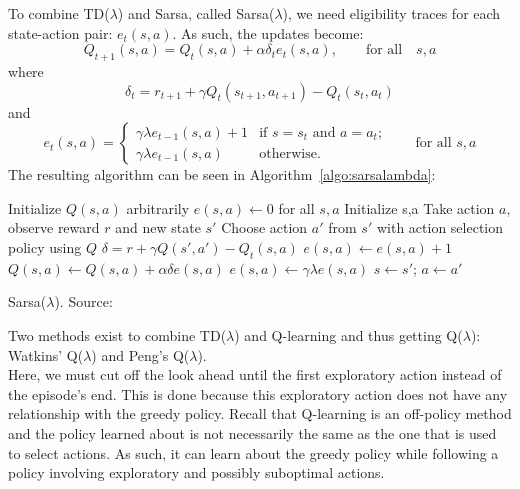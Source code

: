 To combine TD($\lambda$) and Sarsa, called Sarsa($\lambda$), we need eligibility traces for each state-action pair: $e_t(s,a)$. As such, the updates become:
\begin{equation}
Q_{t+1}(s,a) = Q_t(s,a) + \alpha \delta_t e_t(s,a), \qquad \text{for all} \quad s,a
\end{equation}
where
\begin{equation}
\delta_t = r_{t+1} + \gamma Q_t(s_{t+1},a_{t+1}) - Q_t(s_t,a_t)
\end{equation}
and
\begin{equation}
e_t(s,a) = \begin{cases}
    \gamma \lambda e_{t-1}(s,a) + 1 & \text{if $s=s_t$ and $a=a_t$;} \\
    \gamma \lambda e_{t-1}(s,a) & \text{otherwise}.
\end{cases}
\qquad \text{for all $s,a$}
\end{equation}
The resulting algorithm can be seen in Algorithm~\ref{algo:sarsalambda}:\\
\begin{algorithm}[htb]
\DontPrintSemicolon
Initialize $Q(s,a)$ arbitrarily\;
$e(s,a) \gets 0$ for all $s,a$\;
 {
    Initialize s,a\;
     {
        Take action $a$, observe reward $r$ and new state $s'$\;
        Choose action $a'$ from $s'$ with action selection policy using $Q$\;
        $\delta = r + \gamma Q(s',a') - Q_t(s,a)$\;
        $e(s,a) \gets e(s,a) + 1$\;
         {
            $Q(s,a) \gets Q(s,a) + \alpha \delta e(s,a)$\;
            $e(s,a) \gets \gamma \lambda e(s,a)$\;
        }
        $s \gets s'$; $a \gets a'$\;
    }
}
\caption[Sarsa($\lambda$)]{Sarsa($\lambda$). Source: \cite{Sutton1998ReinforcementIntroduction}}
\label{algo:sarsalambda}
\end{algorithm}
Two methods exist to combine TD($\lambda$) and Q-learning and thus getting Q($\lambda$): Watkins' Q($\lambda$) and Peng's Q($\lambda$).\\
Here, we must cut off the look ahead until the first exploratory action instead of the episode's end. This is done because this exploratory action does not have any relationship with the greedy policy. Recall that Q-learning is an off-policy method and the policy learned about is not necessarily the same as the one that is used to select actions. As such, it can learn about the greedy policy while following a policy involving exploratory and possibly suboptimal actions.

